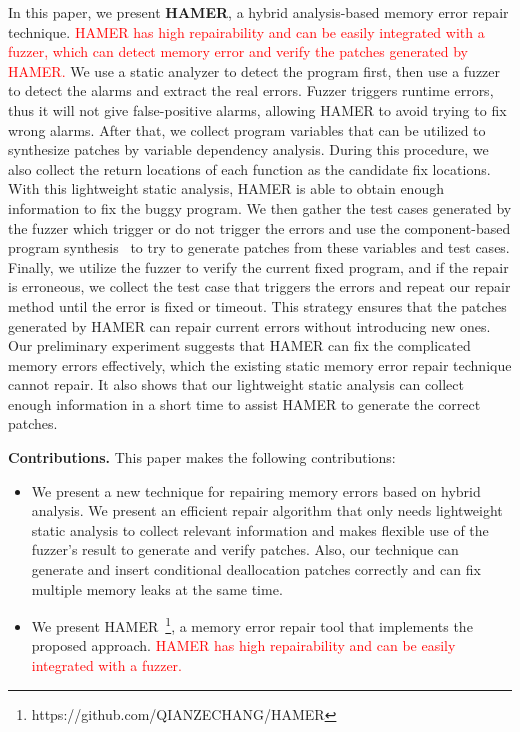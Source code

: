 \documentclass[a4paper,11pt,oneside,openany]{book}
\begin{document}
In this paper, we present \textbf{HAMER}, a hybrid analysis-based memory error repair \mbox{technique}. \textcolor{red}{HAMER has high repairability and can be easily integrated with a fuzzer, which can detect memory error and verify the patches generated by HAMER.} We use a static analyzer to detect the program first, then use a fuzzer to detect the alarms and extract the real errors. Fuzzer triggers runtime errors, thus it will not give false-positive alarms, allowing HAMER to avoid trying to fix wrong alarms. After that, we collect program variables that can be utilized to synthesize patches by variable dependency analysis. During this procedure, we also collect the return locations of each function as the candidate fix locations. With this lightweight static analysis, HAMER is able to obtain enough information to fix the buggy program. We then gather the test cases generated by the fuzzer which trigger or do not trigger the errors and use the component-based program synthesis~\cite{oracle} to try to generate patches from these variables and test cases. Finally, we utilize the fuzzer to verify the current fixed program, and if the repair is erroneous, we collect the test case that triggers the errors and repeat our repair method until the error is fixed or timeout. This strategy ensures that the patches generated by HAMER can repair current errors without introducing new ones. Our preliminary experiment suggests that HAMER can fix the complicated memory errors effectively, which the existing static memory error repair technique cannot repair. It also shows that our lightweight static analysis can collect enough information in a short time to assist HAMER to generate the correct patches.

\textbf{Contributions.} This paper makes the following contributions:
\begin{itemize}
  \item We present a new technique for repairing memory errors based on hybrid analysis. We present an efficient repair algorithm that only needs lightweight static analysis to collect relevant information and makes flexible use of the fuzzer's result to generate and verify patches. Also, our technique can generate and insert conditional deallocation patches correctly and can fix multiple memory leaks at the same time.
  \item We present HAMER~\footnote{https://github.com/QIANZECHANG/HAMER}, a memory error repair tool that implements the proposed approach. \textcolor{red}{HAMER has high repairability and can be easily integrated with a fuzzer.}
\end{itemize}
\end{document}
